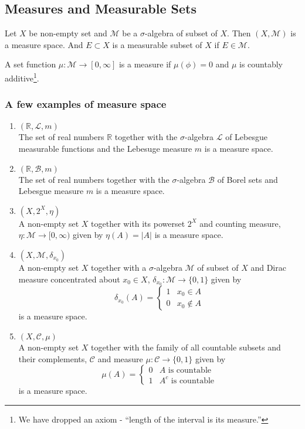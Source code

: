 \subsection{Measures and Measurable Sets}
\begin{definition}
	Let $X$ be non-empty set and $\mathcal{M}$ be a $\sigma$-algebra of subset of $X$.
	Then $(X,\mathcal{M})$ is a measure space.
	And $E \subset X$ is a measurable subset of $X$ if $E \in \mathcal{M}$.
\end{definition}
\begin{definition}[measure]
	A set function $\mu : \mathcal{M} \to [0,\infty]$ is a measure if $\mu(\phi) = 0$ and $\mu$ is countably additive\dag\footnote{
		We have dropped an axiom - ``length of the interval is its measure.''}.
\end{definition}
\subsubsection{A few examples of measure space}
\begin{enumerate}
	\item $(\mathbb{R},\mathcal{L},m)$\\
		The set of real numbers $\mathbb{R}$ together with the $\sigma$-algebra $\mathcal{L}$ of Lebesgue measurable functions and the Lebesuge measure $m$ is a measure space.
	\item $(\mathbb{R},\mathcal{B},m)$ \\
		The set of real numbers together with the $\sigma$-algebra $\mathcal{B}$ of Borel sets and Lebesgue measure $m$ is a measure space.
	\item $(X,2^X,\eta)$\\
		A non-empty set $X$ together with its powerset $2^X$ and counting measure, $\eta : \mathcal{M} \to [0,\infty)$ given by $\eta(A) = |A|$ is a measure space.
	\item $(X,\mathcal{M},\delta_{x_0})$\\
		A non-empty set $X$ together with a $\sigma$-algebra $\mathcal{M}$ of subset of $X$ and Dirac measure concentrated about $x_0 \in X$, $\delta_{x_0} : \mathcal{M} \to \{ 0,1 \}$ given by
		$$\delta_{x_0}(A) = \begin{cases}1 & x_0 \in A \\ 0 & x_0 \notin A \end{cases}$$
			is a measure space.
	\item $(X,\mathcal{C},\mu)$ \\
		A non-empty set $X$ together with the family of all countable subsets and their complements, $\mathcal{C}$ and measure $\mu : \mathcal{C} \to \{0,1\}$ given by 
		$$\mu(A) = \begin{cases} 0 & A \text{ is countable} \\ 1 & A^c \text{ is countable} \end{cases}$$
			is a measure space.
\end{enumerate}

